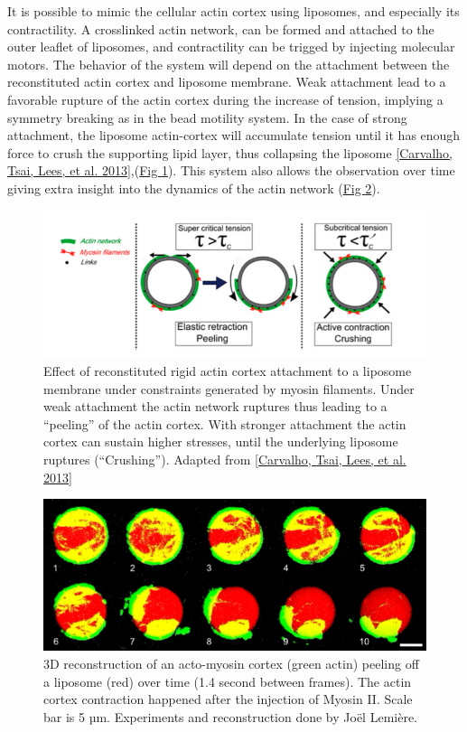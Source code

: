 \documentclass[A4paperpaper,11pt,english]{sphinxmanual}
\begin{document}
It is possible to mimic the cellular actin cortex using liposomes, and especially
its contractility. A crosslinked actin network, can be formed and attached to
the outer leaflet of liposomes, and contractility can be trigged by injecting
molecular motors. The behavior of the system will depend on the attachment
between the reconstituted actin cortex and liposome membrane.  Weak attachment
lead to a favorable rupture of the actin cortex during the increase of tension,
implying a symmetry breaking as in the bead motility system.  In the case of strong
attachment, the liposome actin-cortex will accumulate tension until it has
enough force to crush the supporting lipid layer, thus collapsing the liposome
{\hyperref[index-latex:carvalho2013]{{[}Carvalho, Tsai, Lees,  et al.  2013{]}}},(\hyperref[index-latex:fig-peeling-scheme]{Fig  \ref*{index-latex:fig-peeling-scheme}}). This system also allows the observation
over time giving extra insight into the dynamics of the actin network (\hyperref[index-latex:fig-peeling-3d]{Fig  \ref*{index-latex:fig-peeling-3d}}).
\begin{figure}[htbp]
\centering
\capstart

\includegraphics[width=0.800\linewidth]{joel-2-11.png}
\caption{Effect of reconstituted rigid actin cortex attachment to a liposome
membrane under constraints generated by myosin filaments. Under weak attachment
the actin network ruptures thus leading to a ``peeling'' of the actin cortex.
With stronger attachment the actin cortex can sustain higher stresses, until
the underlying liposome ruptures (``Crushing''). Adapted from
{\hyperref[index-latex:carvalho2013]{{[}Carvalho, Tsai, Lees,  et al.  2013{]}}}}\label{index-latex:fig-peeling-scheme}\end{figure}
\begin{figure}[htbp]
\centering
\capstart

\includegraphics[width=0.900\linewidth]{joel-5-12.png}
\caption{3D reconstruction of an acto-myosin cortex (green actin) peeling off a
liposome (red) over time (1.4 second between frames). The actin cortex
contraction happened after the injection of Myosin II. Scale bar is 5 µm.
Experiments and reconstruction done by Joël Lemière.}\label{index-latex:fig-peeling-3d}\end{figure}
\end{document}
